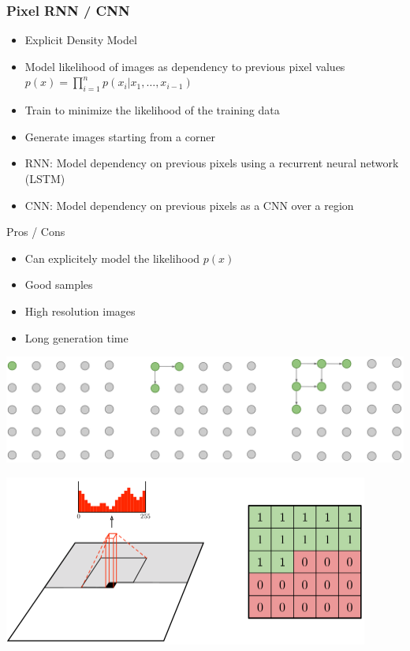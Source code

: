\subsubsection{Pixel RNN / CNN}
\begin{minipage}{0.5\textwidth}
    \begin{itemize}
        \item Explicit Density Model
        \item Model likelihood of images as dependency to previous pixel values $p(x) = \prod_{i=1}^n p(x_i|x_1,\ldots,x_{i-1})$
        \item Train to minimize the likelihood of the training data
        \item Generate images starting from a corner
        \item RNN: Model dependency on previous pixels using a recurrent neural network (LSTM)
        \item CNN: Model dependency on previous pixels as a CNN over a region
    \end{itemize}
    Pros / Cons
    \begin{itemize}
        \item Can explicitely model the likelihood $p(x)$
        \item Good samples
        \item High resolution images
        \item Long generation time
    \end{itemize}
\end{minipage}
\begin{minipage}{0.5\textwidth}
    \centering
    \includegraphics[width=.95\textwidth]{sections/GeneratingImages/img/pixel_rnn.png}

    \includegraphics[width=0.9\textwidth]{sections/GeneratingImages/img/pixel_cnn.png}
\end{minipage}

